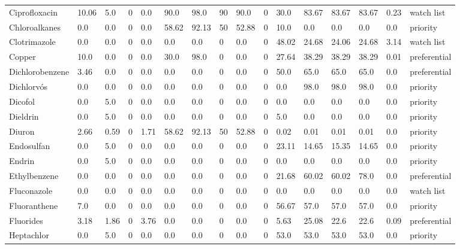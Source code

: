 \begin{tabular}{llllllllllllllll}
Ciprofloxacin & 10.06 & 5.0 & 0 & 0.0 & 90.0 & 98.0 & 90 & 90.0 & 0 & 30.0 & 83.67 & 83.67 & 83.67 & 0.23 & watch list \\
\cline{1-16}
Chloroalkanes & 0.0 & 0.0 & 0 & 0.0 & 58.62 & 92.13 & 50 & 52.88 & 0 & 10.0 & 0.0 & 0.0 & 0.0 & 0.0 & priority \\
\cline{1-16}
Clotrimazole & 0.0 & 0.0 & 0 & 0.0 & 0.0 & 0.0 & 0 & 0.0 & 0 & 48.02 & 24.68 & 24.06 & 24.68 & 3.14 & watch list \\
\cline{1-16}
Copper & 10.0 & 0.0 & 0 & 0.0 & 30.0 & 98.0 & 0 & 0.0 & 0 & 27.64 & 38.29 & 38.29 & 38.29 & 0.01 & preferential \\
\cline{1-16}
Dichlorobenzene & 3.46 & 0.0 & 0 & 0.0 & 0.0 & 0.0 & 0 & 0.0 & 0 & 50.0 & 65.0 & 65.0 & 65.0 & 0.0 & preferential \\
\cline{1-16}
Dichlorvós & 0.0 & 0.0 & 0 & 0.0 & 0.0 & 0.0 & 0 & 0.0 & 0 & 0.0 & 98.0 & 98.0 & 98.0 & 0.0 & priority \\
\cline{1-16}
Dicofol & 0.0 & 5.0 & 0 & 0.0 & 0.0 & 0.0 & 0 & 0.0 & 0 & 0.0 & 0.0 & 0.0 & 0.0 & 0.0 & priority \\
\cline{1-16}
Dieldrin & 0.0 & 5.0 & 0 & 0.0 & 0.0 & 0.0 & 0 & 0.0 & 0 & 5.0 & 0.0 & 0.0 & 0.0 & 0.0 & priority \\
\cline{1-16}
Diuron & 2.66 & 0.59 & 0 & 1.71 & 58.62 & 92.13 & 50 & 52.88 & 0 & 0.02 & 0.01 & 0.01 & 0.01 & 0.0 & priority \\
\cline{1-16}
Endosulfan & 0.0 & 5.0 & 0 & 0.0 & 0.0 & 0.0 & 0 & 0.0 & 0 & 23.11 & 14.65 & 15.35 & 14.65 & 0.0 & priority \\
\cline{1-16}
Endrin & 0.0 & 5.0 & 0 & 0.0 & 0.0 & 0.0 & 0 & 0.0 & 0 & 0.0 & 0.0 & 0.0 & 0.0 & 0.0 & priority \\
\cline{1-16}
Ethylbenzene & 0.0 & 0.0 & 0 & 0.0 & 0.0 & 0.0 & 0 & 0.0 & 0 & 21.68 & 60.02 & 60.02 & 78.0 & 0.0 & preferential \\
\cline{1-16}
Fluconazole & 0.0 & 0.0 & 0 & 0.0 & 0.0 & 0.0 & 0 & 0.0 & 0 & 0.0 & 0.0 & 0.0 & 0.0 & 0.0 & watch list \\
\cline{1-16}
Fluoranthene & 7.0 & 0.0 & 0 & 0.0 & 0.0 & 0.0 & 0 & 0.0 & 0 & 56.67 & 57.0 & 57.0 & 57.0 & 0.0 & priority \\
\cline{1-16}
Fluorides & 3.18 & 1.86 & 0 & 3.76 & 0.0 & 0.0 & 0 & 0.0 & 0 & 5.63 & 25.08 & 22.6 & 22.6 & 0.09 & preferential \\
\cline{1-16}
Heptachlor & 0.0 & 5.0 & 0 & 0.0 & 0.0 & 0.0 & 0 & 0.0 & 0 & 53.0 & 53.0 & 53.0 & 53.0 & 0.0 & priority \\

\end{tabular}
